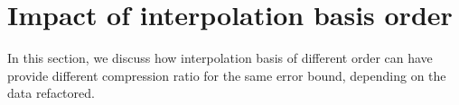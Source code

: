 \documentclass[conference]{IEEEtran}
\theoremstyle{remark}
\begin{document}

\section{Impact of interpolation basis order}
\label{sec:Impact}

In this section, we discuss how interpolation basis of different order can have provide different compression ratio for the same error bound, depending on the data refactored. 
\end{document}
